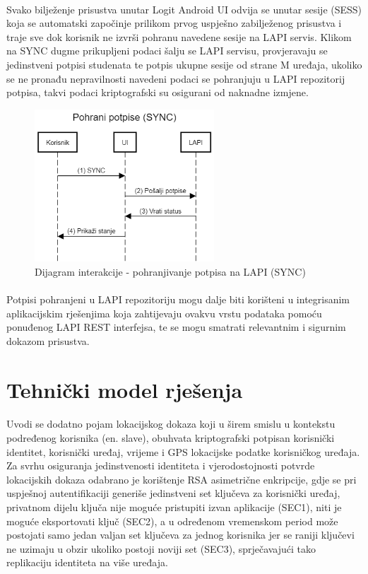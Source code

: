\paragraph*{}
Svako bilježenje prisustva unutar Logit Android UI odvija se unutar sesije (SESS) koja se automatski započinje prilikom prvog uspješno zabilježenog prisustva i traje sve dok korisnik ne izvrši pohranu navedene sesije na LAPI servis. Klikom na SYNC dugme prikupljeni podaci šalju se LAPI servisu, provjeravaju se jedinstveni potpisi studenata te potpis ukupne sesije od strane M uređaja, ukoliko se ne pronađu nepravilnosti navedeni podaci se pohranjuju u LAPI repozitorij potpisa, takvi podaci kriptografski su osigurani od naknadne izmjene.

\begin{figure}[H]
    \centering
    \includegraphics[width=0.6\textwidth]{material/dia/04_sync}
    \caption{Dijagram interakcije - pohranjivanje potpisa na LAPI (SYNC)}
\end{figure}
\paragraph*{}
Potpisi pohranjeni u LAPI repozitoriju mogu dalje biti korišteni u integrisanim aplikacijskim rješenjima koja zahtijevaju ovakvu vrstu podataka pomoću ponuđenog LAPI REST interfejsa, te se mogu smatrati relevantnim i sigurnim dokazom prisustva.

\section{Tehnički model rješenja}
\paragraph*{}
Uvodi se dodatno pojam lokacijskog dokaza\cite{locproof} koji u širem smislu u kontekstu podređenog korisnika (en. slave), obuhvata kriptografski potpisan korisnički identitet, korisnički uređaj, vrijeme i GPS lokacijske podatke korisničkog uređaja. Za svrhu osiguranja jedinstvenosti identiteta i vjerodostojnosti potvrde lokacijskih dokaza odabrano je korištenje RSA asimetrične enkripcije, gdje se pri uspješnoj autentifikaciji generiše jedinstveni set ključeva za korisnički uređaj, privatnom dijelu ključa nije moguće pristupiti izvan aplikacije (SEC1), niti je moguće eksportovati ključ (SEC2), a u određenom vremenskom period može postojati samo jedan valjan set ključeva za jednog korisnika jer se raniji ključevi ne uzimaju u obzir ukoliko postoji noviji set (SEC3), sprječavajući tako replikaciju identiteta na više uređaja.

